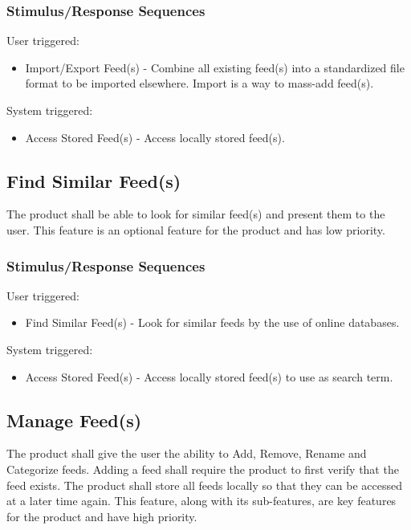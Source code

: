 \subsubsection{Stimulus/Response Sequences}
User triggered:
\begin{itemize}
  \item Import/Export Feed(s) - Combine all existing feed(s) into a standardized file format to be imported elsewhere. Import  is a way to mass-add feed(s).
\end{itemize}
System triggered:
\begin{itemize}
  \item Access Stored Feed(s) - Access locally stored feed(s).
\end{itemize}


\subsection{Find Similar Feed(s)}
The product shall be able to look for similar feed(s) and present them to the user. This feature is an optional feature for the product and has low priority.


\subsubsection{Stimulus/Response Sequences}
User triggered:
\begin{itemize}
  \item Find Similar Feed(s) - Look for similar feeds by the use of online databases.
\end{itemize}
System triggered:
\begin{itemize}
  \item Access Stored Feed(s) - Access locally stored feed(s) to use as search term.
\end{itemize}


\subsection{Manage Feed(s)}
The product shall give the user the ability to Add, Remove, Rename and Categorize feeds. Adding a feed shall require the product to first verify that the feed exists. The product shall store all feeds locally so that they can be accessed at a later time again. This feature, along with its sub-features, are key features for the product and have high priority.


